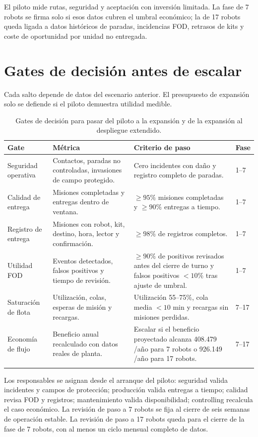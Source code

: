 El piloto mide rutas, seguridad y aceptación con inversión limitada. La fase de 7 robots se firma solo si esos datos cubren el umbral económico; la de 17 robots queda ligada a datos históricos de paradas, incidencias FOD, retrasos de kits y coste de oportunidad por unidad no entregada.

\section{Gates de decisión antes de escalar}

Cada salto depende de datos del escenario anterior. El presupuesto de expansión solo se defiende si el piloto demuestra utilidad medible.

\begin{longtable}{P{0.24\textwidth}P{0.30\textwidth}P{0.26\textwidth}P{0.10\textwidth}}
\toprule
Gate & Métrica & Criterio de paso & Fase\\
\midrule
\endhead
Seguridad operativa & Contactos, paradas no controladas, invasiones de campo protegido. & Cero incidentes con daño y registro completo de paradas. & 1--7\\
Calidad de entrega & Misiones completadas y entregas dentro de ventana. & \(\geq 95\%\) misiones completadas y \(\geq 90\%\) entregas a tiempo. & 1--7\\
Registro de entrega & Misiones con robot, kit, destino, hora, lector y confirmación. & \(\geq 98\%\) de registros completos. & 1--7\\
Utilidad FOD & Eventos detectados, falsos positivos y tiempo de revisión. & \(\geq 90\%\) de positivos revisados antes del cierre de turno y falsos positivos \(<10\%\) tras ajuste de umbral. & 1--7\\
Saturación de flota & Utilización, colas, esperas de misión y recargas. & Utilización 55--75\%, cola media \(<10\) min y recargas sin misiones perdidas. & 7--17\\
Economía de flujo & Beneficio anual recalculado con datos reales de planta. & Escalar si el beneficio proyectado alcanza 408.479 \texteuro{}/año para 7 robots o 926.149 \texteuro{}/año para 17 robots. & 7--17\\
\bottomrule
\caption{Gates de decisión para pasar del piloto a la expansión y de la expansión al despliegue extendido.}
\label{tab:gates-escalado}
\end{longtable}

Los responsables se asignan desde el arranque del piloto: seguridad valida incidentes y campos de protección; producción valida entregas a tiempo; calidad revisa FOD y registros; mantenimiento valida disponibilidad; controlling recalcula el caso económico. La revisión de paso a 7 robots se fija al cierre de seis semanas de operación estable. La revisión de paso a 17 robots queda para el cierre de la fase de 7 robots, con al menos un ciclo mensual completo de datos.

